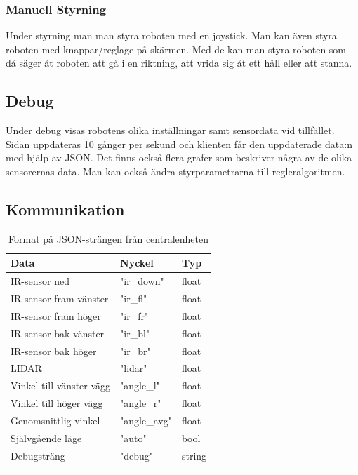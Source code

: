 \documentclass[a4paper,titlepage,12pt]{article}
\begin{document}
    \subsubsection{Manuell Styrning}
    Under styrning man man styra roboten med en joystick. Man kan även
    styra roboten med knappar/reglage på skärmen. Med de kan man styra
    roboten som då säger åt roboten att gå i en riktning,
    att vrida sig åt ett håll eller att stanna.

    \subsection{Debug}
	Under debug visas robotens olika inställningar samt sensordata vid
    tillfället. Sidan uppdateras 10 gånger per sekund och klienten får den
    uppdaterade data:n med hjälp av JSON. Det finns också flera grafer
    som beskriver några av de olika sensorernas data. Man kan också ändra
    styrparametrarna till regleralgoritmen.

	\label{gui:kommunikation}
    \subsection{Kommunikation}

	\begin{longtable}[c]{l l l }
        \textbf{Data} & \textbf{Nyckel} & \textbf{Typ} \\ \midrule
        IR-sensor ned & "ir\_down" & float \\
        IR-sensor fram vänster & "ir\_fl" & float \\
        IR-sensor fram höger & "ir\_fr" & float \\
        IR-sensor bak vänster & "ir\_bl" & float \\
        IR-sensor bak höger & "ir\_br" & float \\
        LIDAR & "lidar" & float \\
        Vinkel till vänster vägg & "angle\_l" & float \\
        Vinkel till höger vägg & "angle\_r" & float \\
        Genomsnittlig vinkel & "angle\_avg" & float \\
        Självgående läge & "auto" & bool \\
        Debugsträng & "debug" & string \\

		\caption{Format på JSON-strängen från
        centralenheten\label{table:guimessagesfromcentral}}
	\end{longtable}
\end{document}
